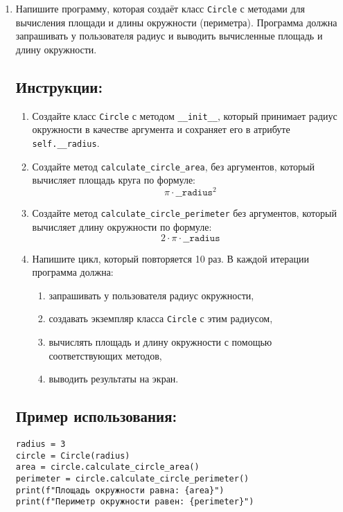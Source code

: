 \begin{enumerate}
    \item 

Напишите программу, которая создаёт класс
\texttt{Circle} с методами для вычисления площади
и длины окружности (периметра). Программа должна запрашивать у пользователя радиус
и выводить вычисленные площадь и длину окружности.

\subsection*{Инструкции:}
\begin{enumerate}
\item Создайте класс \texttt{Circle} с методом
\texttt{\_\_init\_\_}, который принимает радиус окружности в
качестве аргумента и сохраняет его в атрибуте \texttt{self.\_\_radius}.

\item Создайте метод \texttt{calculate\_circle\_area},
без аргументов, который вычисляет площадь круга по формуле:
\[
\pi \cdot \texttt{\_\_radius}^2
\]

\item Создайте метод \texttt{calculate\_circle\_perimeter} без аргументов,
который вычисляет длину окружности по формуле:
\[
2 \cdot \pi \cdot \texttt{\_\_radius}
\]

\item Напишите цикл, который повторяется 10 раз. В каждой итерации программа должна:
\begin{enumerate}
\item запрашивать у пользователя радиус окружности,
\item создавать экземпляр класса \texttt{Circle} с этим радиусом,
\item вычислять площадь и длину окружности с помощью соответствующих методов,
\item выводить результаты на экран.
\end{enumerate}
\end{enumerate}

\subsection*{Пример использования:}
\begin{verbatim}
radius = 3
circle = Circle(radius)
area = circle.calculate_circle_area()
perimeter = circle.calculate_circle_perimeter()
print(f"Площадь окружности равна: {area}")
print(f"Периметр окружности равен: {perimeter}")
\end{verbatim}


\end{enumerate}

